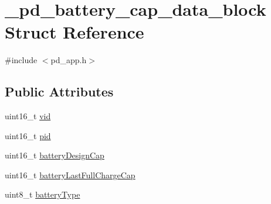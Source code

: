 \hypertarget{struct__pd__battery__cap__data__block}{\section{\-\_\-pd\-\_\-battery\-\_\-cap\-\_\-data\-\_\-block Struct Reference}
\label{struct__pd__battery__cap__data__block}
}


{\ttfamily \#include $<$pd\-\_\-app.\-h$>$}

\subsection*{Public Attributes}
\begin{DoxyCompactItemize}
\item 
uint16\-\_\-t \hyperlink{struct__pd__battery__cap__data__block_a8b906175f5651c5041c707699ebd9388}{vid}
\item 
uint16\-\_\-t \hyperlink{struct__pd__battery__cap__data__block_a3924ff20a280c34339a952b179689def}{pid}
\item 
uint16\-\_\-t \hyperlink{struct__pd__battery__cap__data__block_ab3c3ebf4347b9ed544f266e2f9d34238}{battery\-Design\-Cap}
\item 
uint16\-\_\-t \hyperlink{struct__pd__battery__cap__data__block_a3c566271c930773785e19daf77a05542}{battery\-Last\-Full\-Charge\-Cap}
\item 
uint8\-\_\-t \hyperlink{struct__pd__battery__cap__data__block_afee674b89322db24d60b392150918ab5}{battery\-Type}
\end{DoxyCompactItemize}


